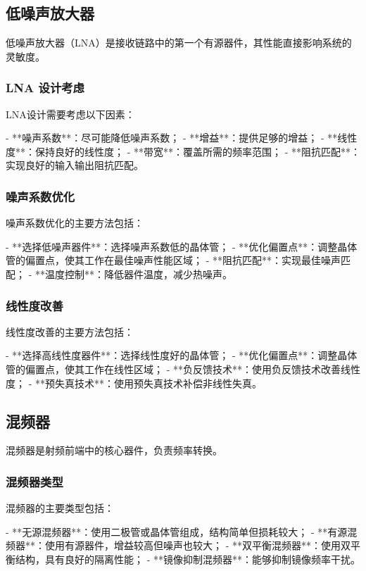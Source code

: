 ﻿\documentclass[UTF8]{ctexbook}
\begin{document}
\subsection{低噪声放大器}

低噪声放大器（LNA）是接收链路中的第一个有源器件，其性能直接影响系统的灵敏度。

\subsubsection{LNA 设计考虑}

LNA设计需要考虑以下因素：

- **噪声系数**：尽可能降低噪声系数；
- **增益**：提供足够的增益；
- **线性度**：保持良好的线性度；
- **带宽**：覆盖所需的频率范围；
- **阻抗匹配**：实现良好的输入输出阻抗匹配。

\subsubsection{噪声系数优化}

噪声系数优化的主要方法包括：

- **选择低噪声器件**：选择噪声系数低的晶体管；
- **优化偏置点**：调整晶体管的偏置点，使其工作在最佳噪声性能区域；
- **阻抗匹配**：实现最佳噪声匹配；
- **温度控制**：降低器件温度，减少热噪声。

\subsubsection{线性度改善}

线性度改善的主要方法包括：

- **选择高线性度器件**：选择线性度好的晶体管；
- **优化偏置点**：调整晶体管的偏置点，使其工作在线性区域；
- **负反馈技术**：使用负反馈技术改善线性度；
- **预失真技术**：使用预失真技术补偿非线性失真。

\subsection{混频器}

混频器是射频前端中的核心器件，负责频率转换。

\subsubsection{混频器类型}

混频器的主要类型包括：

- **无源混频器**：使用二极管或晶体管组成，结构简单但损耗较大；
- **有源混频器**：使用有源器件，增益较高但噪声也较大；
- **双平衡混频器**：使用双平衡结构，具有良好的隔离性能；
- **镜像抑制混频器**：能够抑制镜像频率干扰。
\end{document}
